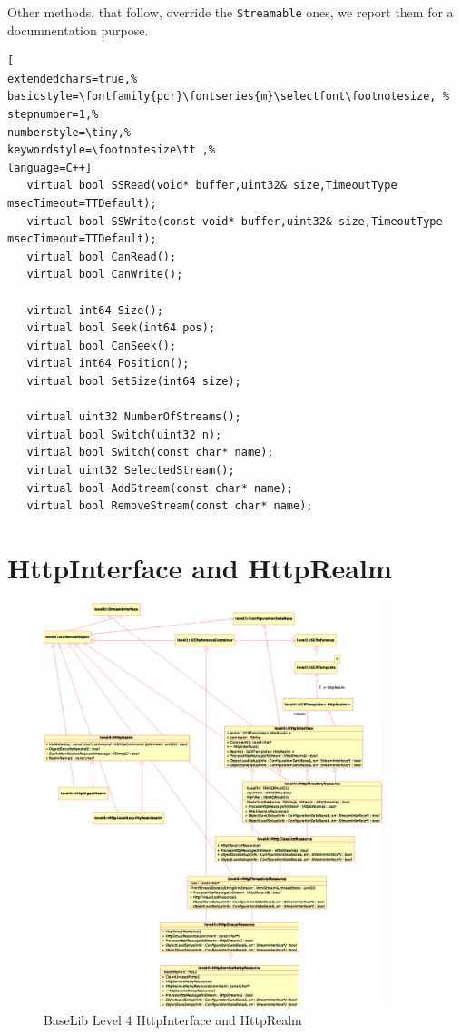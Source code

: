 Other methods, that follow, override the \texttt{Streamable} ones, we report them for a documnentation purpose.

\begin{lstlisting}[
extendedchars=true,%
basicstyle=\fontfamily{pcr}\fontseries{m}\selectfont\footnotesize, %
stepnumber=1,%
numberstyle=\tiny,%
keywordstyle=\footnotesize\tt ,%
language=C++]
   virtual bool SSRead(void* buffer,uint32& size,TimeoutType msecTimeout=TTDefault);
   virtual bool SSWrite(const void* buffer,uint32& size,TimeoutType msecTimeout=TTDefault);
   virtual bool CanRead();
   virtual bool CanWrite();

   virtual int64 Size();
   virtual bool Seek(int64 pos);
   virtual bool CanSeek();
   virtual int64 Position();
   virtual bool SetSize(int64 size);

   virtual uint32 NumberOfStreams();
   virtual bool Switch(uint32 n);
   virtual bool Switch(const char* name);
   virtual uint32 SelectedStream();
   virtual bool AddStream(const char* name);
   virtual bool RemoveStream(const char* name);
\end{lstlisting}



\section{HttpInterface and HttpRealm}


\begin{figure}[h!]
 \begin{center}
  \includegraphics[width=0.88\textwidth]{level4/level4-HttpInterface.eps}
  \caption{BaseLib Level 4 HttpInterface and HttpRealm}
  \label{f:level4:HttpInterface}
 \end{center}
\end{figure}

